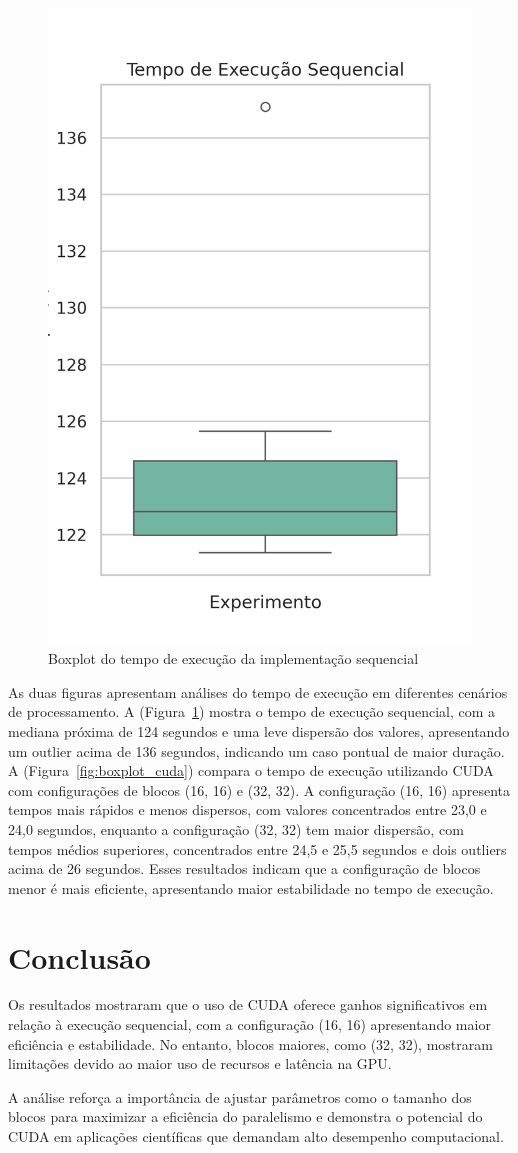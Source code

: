 \documentclass[12pt]{article}
\begin{document}
\begin{figure}[ht]
  \centering
  \includegraphics[width=.35\textwidth]{figs/times_boxplot_sequential.png}
  \caption{Boxplot do tempo de execução da implementação sequencial}\label{fig:boxplot_sequential}
\end{figure}

As duas figuras apresentam análises do tempo de execução em diferentes cenários
de processamento. A (Figura~\ref{fig:boxplot_sequential}) mostra o tempo de
execução sequencial, com a mediana próxima de 124 segundos e uma leve dispersão
dos valores, apresentando um outlier acima de 136 segundos, indicando um caso
pontual de maior duração. A (Figura~\ref{fig:boxplot_cuda}) compara o tempo de
execução utilizando CUDA com configurações de blocos (16, 16) e (32, 32). A
configuração (16, 16) apresenta tempos mais rápidos e menos dispersos, com
valores concentrados entre 23,0 e 24,0 segundos, enquanto a configuração (32,
32) tem maior dispersão, com tempos médios superiores, concentrados entre 24,5
e 25,5 segundos e dois outliers acima de 26 segundos. Esses resultados indicam
que a configuração de blocos menor é mais eficiente, apresentando maior
estabilidade no tempo de execução.

\section{Conclusão}
Os resultados mostraram que o uso de CUDA oferece ganhos significativos em
relação à execução sequencial, com a configuração (16, 16) apresentando maior
eficiência e estabilidade. No entanto, blocos maiores, como (32, 32), mostraram
limitações devido ao maior uso de recursos e latência na GPU.

A análise reforça a importância de ajustar parâmetros como o tamanho dos blocos
para maximizar a eficiência do paralelismo e demonstra o potencial do CUDA em
aplicações científicas que demandam alto desempenho computacional.



\nocite{*}
\end{document}
